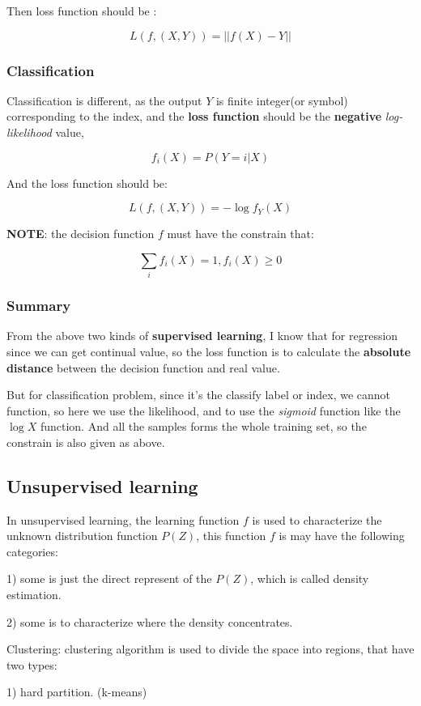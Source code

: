 \documentclass{article}
\begin{document}
Then loss function should be :

$$L(f, (X,Y)) = ||f(X) - Y||$$

\subsubsection{Classification}
Classification is different, as the output $Y$ is finite integer(or symbol) corresponding to the index, and the \textbf{loss function} should be the \textbf{negative} \emph{log-likelihood} value,

$$f_i(X) = P(Y = i | X)$$ 

And the loss function should be:

$$L(f, (X,Y)) = -\log{f_Y(X)}$$

\textbf{NOTE}: the decision function $f$ must have the constrain that:

$$\sum_i{f_i(X)} = 1, f_i(X) \geq 0$$

\subsubsection{Summary}
From the above two kinds of \textbf{supervised learning}, I know that for regression since we can get continual value, so the loss function is to calculate the \textbf{absolute distance} between the decision function and real value.

But for classification problem, since it's the classify label or index, we cannot function, so here we use the likelihood, and to use the \emph{sigmoid} function like the $\log{X}$ function. And all the samples forms the whole training set, so the constrain is also given as above. 

\subsection{Unsupervised learning}
In unsupervised learning, the learning function $f$ is used to characterize the unknown distribution function $P(Z)$, this function $f$ is may have the following categories:

1) some is just the direct represent of the $P(Z)$, which is called density estimation.

2) some is to characterize where the density concentrates.

Clustering: clustering algorithm is used to divide the space into regions, that have two types:

1) hard partition. (k-means)
\end{document}
